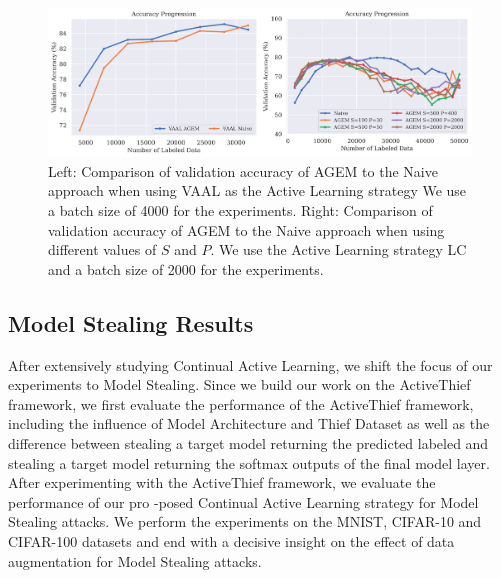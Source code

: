 \begin{figure}[h]
    \centering
    \includegraphics[width=\linewidth]{images/results_CAL/AGEM_plots.png}
    \caption[Continual Active Learning Custom Replay strategy]{Left: Comparison of validation accuracy of AGEM to the Naive approach when using VAAL as the Active Learning strategy We use a batch size of 4000 for the experiments. Right: Comparison of validation accuracy of AGEM
     to the Naive approach when using different values of $S$ and $P$. We use the Active Learning strategy LC and a batch size of 2000 for the experiments.}
    \label{fig:Evaluation:Results:CAL:AGEM}
\end{figure}

\subsection{Model Stealing Results}
\label{sec:Evaluation:Results:MS}
After extensively studying Continual Active Learning, we shift the focus of our experiments to Model Stealing. Since we build our work on the ActiveThief framework, we first evaluate the performance of the ActiveThief framework, including the influence of Model Architecture and
Thief Dataset as well as the difference between stealing a target model returning the predicted labeled and stealing a target model returning the softmax outputs of the final model layer. After experimenting with the ActiveThief framework, we evaluate the performance of our pro
-posed Continual Active Learning strategy for Model Stealing attacks. We perform the experiments on the MNIST, CIFAR-10 and CIFAR-100 datasets and end with a decisive insight on the effect of data augmentation for Model Stealing attacks. \par


